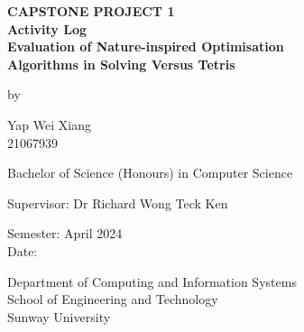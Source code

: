 \documentclass[a4paper, 12pt]{extreport}
\begin{document}
	
	\onehalfspacing
	
	\begin{titlepage}
	
	\centering
	
	\vspace{.5cm}
	
	\begin{center}
		\textbf{\large CAPSTONE PROJECT 1} \\
		\textbf{\large Activity Log} \\
		\vspace{1cm}
		\textbf{\large Evaluation of Nature-inspired Optimisation\\Algorithms in Solving Versus Tetris}
		
		\vspace{1cm}
		
		by
		
		\vspace{1cm}
		
		\large Yap Wei Xiang \\
		21067939
		
		\vspace{1cm}
		
		Bachelor of Science (Honours) in Computer Science
		
		\vspace{1cm}
		
		\large Supervisor: Dr Richard Wong Teck Ken
		
		\vspace{1cm}
		
		\normalsize Semester: April 2024 \\
		Date: %
		
		\vfill
		
		Department of Computing and Information Systems\\
		School of Engineering and Technology\\
		Sunway University
	\end{center}
	
\end{titlepage}
	
\end{document}
